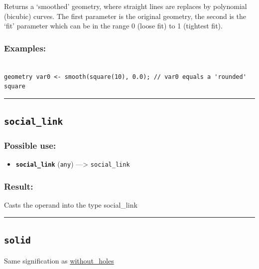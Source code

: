 \documentclass[]{book}
\providecommand{\tightlist}{%
  \setlength{\itemsep}{0pt}\setlength{\parskip}{0pt}}
\theoremstyle{definition}
\theoremstyle{definition}
\theoremstyle{definition}
\theoremstyle{remark}
\begin{document}
Returns a `smoothed' geometry, where straight lines are replaces by
polynomial (bicubic) curves. The first parameter is the original
geometry, the second is the `fit' parameter which can be in the range 0
(loose fit) to 1 (tightest fit).

\subsubsection{Examples:}\label{examples-338}

\begin{verbatim}
 
geometry var0 <- smooth(square(10), 0.0); // var0 equals a 'rounded' square
\end{verbatim}

\begin{center}\rule{0.5\linewidth}{\linethickness}\end{center}

\subsection{\texorpdfstring{\texttt{social\_link}}{social\_link}}\label{social_link}

\subsubsection{Possible use:}\label{possible-use-485}

\begin{itemize}
\tightlist
\item
  \textbf{\texttt{social\_link}} (\texttt{any}) ---\textgreater{}
  \texttt{social\_link}
\end{itemize}

\subsubsection{Result:}\label{result-469}

Casts the operand into the type social\_link

\begin{center}\rule{0.5\linewidth}{\linethickness}\end{center}

\subsection{\texorpdfstring{\texttt{solid}}{solid}}\label{solid}

Same signification as
\href{operators-s-to-z.html\#without_holes}{without\_holes}
\end{document}
